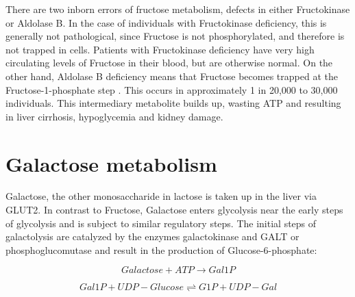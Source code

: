 \documentclass{tufte-handout}
\begin{document}
There are two inborn errors of fructose metabolism, defects in either Fructokinase or Aldolase B.  In the case of individuals with Fructokinase deficiency, this is generally not pathological, since Fructose is not phosphorylated, and therefore is not trapped in cells.  Patients with Fructokinase deficiency have very high circulating levels of Fructose in their blood, but are otherwise normal.  On the other hand, Aldolase B deficiency means that Fructose becomes trapped at the Fructose-1-phosphate step \citep{Cross1988}.  This occurs in approximately 1 in 20,000 to 30,000 individuals.  This intermediary metabolite builds up, wasting ATP and resulting in liver cirrhosis, hypoglycemia and kidney damage.

\section{Galactose metabolism}

Galactose, the other monosaccharide in lactose is taken up in the liver via GLUT2.  In contrast to Fructose, Galactose enters glycolysis near the early steps of glycolysis and is subject to similar regulatory steps.  The initial steps of galactolysis are catalyzed by the enzymes galactokinase and GALT or phosphoglucomutase and result in the production of Glucose-6-phosphate:

\begin{equation}
Galactose + ATP \rightarrow Gal1P
\end{equation}

\begin{equation} \label{eq:galt}
Gal1P + UDP-Glucose \rightleftharpoons G1P + UDP-Gal
\end{equation}
\end{document}
